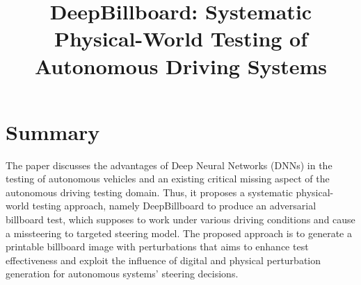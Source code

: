 \documentclass[10pt,a4paper]{report}
\title{DeepBillboard: Systematic Physical-World Testing of Autonomous Driving Systems}
\begin{document}
\begin{center}
\textbf{\thetitle}
\end{center}


\section{Summary}
The paper discusses the advantages of Deep Neural Networks (DNNs) in the testing of autonomous vehicles and an existing critical missing aspect of the autonomous driving testing domain. 
%
Thus, it proposes a systematic physical-world testing approach, namely DeepBillboard to produce an adversarial billboard test, which supposes to work under various driving conditions and cause a missteering to targeted steering model.
%
The proposed approach is to generate a printable billboard image with perturbations that aims to enhance test effectiveness and exploit the influence of digital and physical perturbation generation for autonomous systems' steering decisions.
\end{document}
